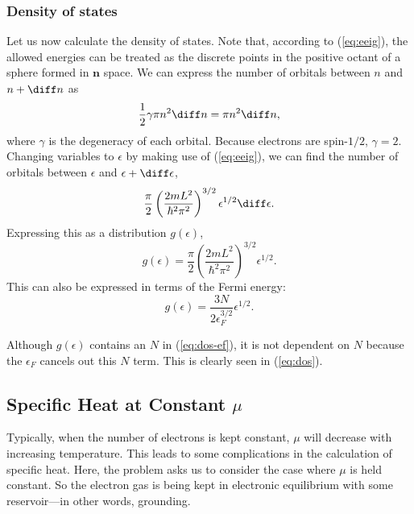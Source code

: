 \documentclass[12pt]{article}
\begin{document}
\subsubsection*{Density of states}

Let us now calculate the density of states.  Note that, according to (\ref{eq:eeig}), the allowed energies can be treated as the discrete points in the positive octant of a sphere formed in $\mathbf{n}$ space.  We can express the number of orbitals between $n$ and $n + \diff n$ as 
\begin{equation}
	\frac{1}{2}\gamma \pi n^2 \diff n = \pi n^2 \diff n,
\end{equation}
where $\gamma$ is the degeneracy of each orbital.  Because electrons are spin-$1/2$, $\gamma = 2$.  Changing variables to $\epsilon$ by making use of (\ref{eq:eeig}), we can find the number of orbitals between $\epsilon$ and $\epsilon + \diff \epsilon$, 
\[
	\frac{\pi}{2}\left( \frac{2mL^2}{\hbar^2 \pi^2} \right)^{3/2} \epsilon^{1/2} \diff \epsilon.
\]
Expressing this as a distribution $g(\epsilon)$,
\begin{equation} \label{eq:dos}
	g(\epsilon) = \frac{\pi}{2}\left( \frac{2mL^2}{\hbar^2 \pi^2} \right)^{3/2} \epsilon^{1/2}.
\end{equation}
This can also be expressed in terms of the Fermi energy:
\begin{equation} \label{eq:dos-ef}
	g(\epsilon) = \frac{3N}{2\epsilon_F^{3/2}} \epsilon^{1/2}.
\end{equation}
\begin{remark}
	Although $g(\epsilon)$ contains an $N$ in (\ref{eq:dos-ef}), it is not dependent on $N$ because the $\epsilon_F$ cancels out this $N$ term. This is clearly seen in (\ref{eq:dos}).
\end{remark}

\subsection*{Specific Heat at Constant $\mu$ }
Typically, when the number of electrons is kept constant, $\mu$ will decrease with increasing temperature.  This leads to some complications in the calculation of specific heat.  Here, the problem asks us to consider the case where $\mu$ is held constant.  So the electron gas is being kept in electronic equilibrium with some reservoir---in other words, grounding.
\end{document}
